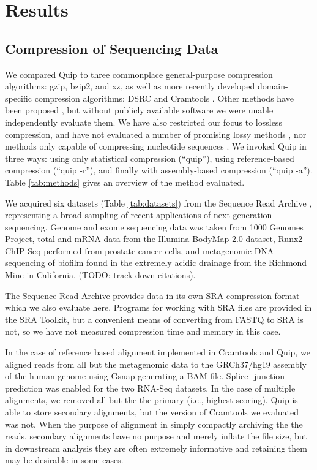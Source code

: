 \documentclass[twocolumn]{article}
\begin{document}
\section{Results}
\label{section:results}

\subsection{Compression of Sequencing Data}


We compared Quip to three commonplace general-purpose compression algorithms:
gzip, bzip2, and xz, as well as more recently developed domain-specific
compression algorithms: DSRC \citep{Deorowicz2011} and Cramtools \citep{Hsi-
YangFritz2011}. Other methods have been proposed \citep{Tembe2010,
Kozanitis2011, Bhola2011}, but without publicly available software we were
unable independently evaluate them. We have also restricted our focus to
lossless compression, and have not evaluated a number of promising lossy
methods \citep{Hsi-YangFritz2011,Wan2011,Hach2012}, nor methods only capable
of compressing nucleotide sequences \citep{Cox2012}. We invoked Quip in three
ways: using only statistical compression (``quip''), using reference-based
compression (``quip -r''), and finally with assembly-based compression (``quip
-a''). Table \ref{tab:methods} gives an overview of the method evaluated.

We acquired six datasets (Table \ref{tab:datasets}) from the Sequence Read
Archive \citep{Leinonen2011}, representing a broad sampling of recent
applications of next-generation sequencing. Genome and exome sequencing data
was taken from 1000 Genomes Project, total and mRNA data from the Illumina
BodyMap 2.0 dataset, Runx2 ChIP-Seq performed from prostate cancer cells, and
metagenomic DNA sequencing of biofilm found in the extremely acidic drainage from
the Richmond Mine in California. (TODO: track down citations).

The Sequence Read Archive provides data in its own SRA compression format
which we also evaluate here. Programs for working with SRA files are provided
in the SRA Toolkit, but a convenient means of converting from FASTQ to SRA is
not, so we have not measured compression time and memory in this case.


In the case of reference based alignment implemented in Cramtools and Quip, we
aligned reads from all but the metagenomic data to the GRCh37/hg19 assembly of
the human genome using Gsnap \citep{Wu2010} generating a BAM file. Splice-
junction prediction was enabled for the two RNA-Seq datasets. In the case of
multiple alignments, we removed all but the the primary (i.e., highest
scoring). Quip is able to store secondary alignments, but the version of
Cramtools we evaluated was not. When the purpose of alignment in simply
compactly archiving the the reads, secondary alignments have no purpose and
merely inflate the file size, but in downstream analysis they are often
extremely informative and retaining them may be desirable in some cases.
\end{document}
